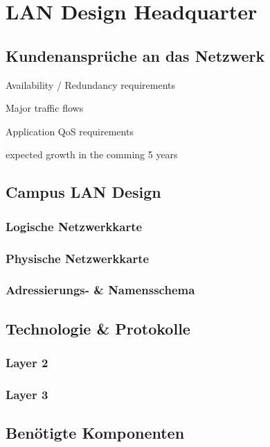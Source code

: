 \section{LAN Design Headquarter}

\subsection{Kundenansprüche an das Netzwerk}

Availability / Redundancy requirements

Major traffic flows

Application QoS requirements

expected growth in the comming 5 years


\subsection{Campus LAN Design}

\subsubsection{Logische Netzwerkkarte}
\subsubsection{Physische Netzwerkkarte}

\subsubsection{Adressierungs- \& Namensschema}

\subsection{Technologie \& Protokolle}
\subsubsection{Layer 2}
\subsubsection{Layer 3}

\subsection{Benötigte Komponenten}

